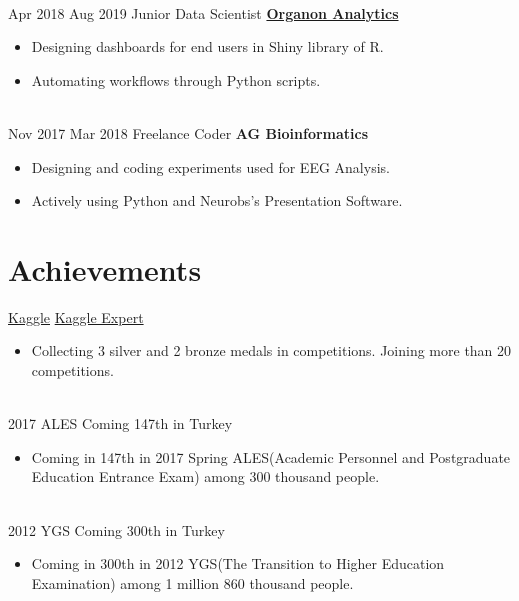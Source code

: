 \documentclass[letterpaper]{DS_class_file} %
\begin{document}
\begin{twenty}
		\\
	\twentyitem
		{Apr 2018}
		{Aug 2019}
		{\hspace{0.3cm}Junior Data Scientist}
		{\href{http://www.organonanalytics.com/pages/index.php}{\textbf{Organon Analytics}}}
		{}
		{\begin{itemize}
			\item Designing dashboards for end users in Shiny library of R.
			\item Automating workflows through Python scripts.
		\end{itemize}}
		\\
	\twentyitem
    	{Nov 2017}
		{Mar 2018}
        {\hspace{0.3cm}Freelance Coder}
        {\textbf{AG Bioinformatics}}
        {}
        {\begin{itemize}
        \item Designing and coding experiments used for EEG Analysis.
        \item Actively using Python and Neurobs's Presentation Software.
        \end{itemize}}
\end{twenty}

\section{Achievements}

\begin{twenty} %
	\twentyitem
	{\href{https://www.kaggle.com}{Kaggle}}
	{}
	{\hspace{0.3cm}\href{https://www.kaggle.com/mbkinaci}{Kaggle Expert}}
	{}
	{}
	{
		{\begin{itemize}
				\item Collecting 3 silver and 2 bronze medals in competitions. Joining more than 20 competitions.
		\end{itemize}}
	}
	\\
	\twentyitem
	{2017 ALES}
	{}
	{\hspace{0.3cm}Coming 147th in Turkey}
	{}
	{}
	{
		{\begin{itemize}
				\item Coming in 147th in 2017 Spring ALES(Academic Personnel and Postgraduate Education Entrance Exam) among 300 thousand people.
		\end{itemize}}
	}
	\\
	\twentyitem
	{2012 YGS}
	{}
	{\hspace{0.3cm}Coming 300th in Turkey}
	{}
	{}
	{\begin{itemize}
			\item Coming in 300th in 2012 YGS(The Transition to Higher Education \newline Examination) among 1 million 860 thousand people.       
	\end{itemize}}

\end{twenty}
\end{document}
